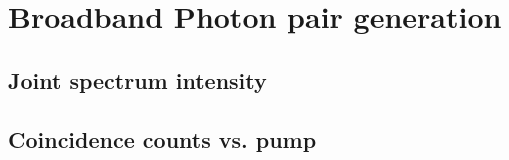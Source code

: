 \chapter{Broadband Photon pair generation}
\section{Joint spectrum intensity}
\section{Coincidence counts vs. pump}

